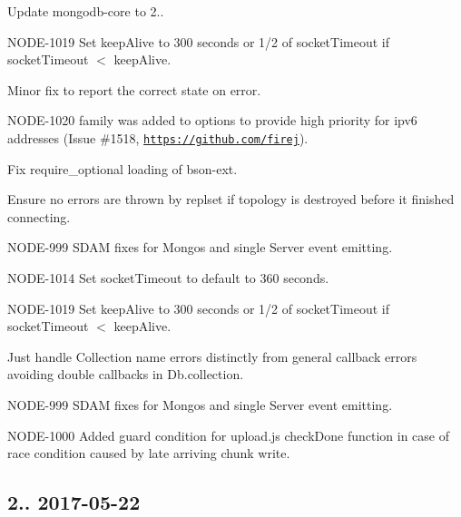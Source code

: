 \begin{DoxyItemize}
\item Update mongodb-\/core to 2..
\begin{DoxyItemize}
\item N\+O\+D\+E-\/1019 Set keep\+Alive to 300 seconds or 1/2 of socket\+Timeout if socket\+Timeout $<$ keep\+Alive.
\item Minor fix to report the correct state on error.
\item N\+O\+D\+E-\/1020 \textquotesingle{}family\textquotesingle{} was added to options to provide high priority for ipv6 addresses (Issue \#1518, \href{https://github.com/firej}{\tt https\+://github.\+com/firej}).
\item Fix require\+\_\+optional loading of bson-\/ext.
\item Ensure no errors are thrown by replset if topology is destroyed before it finished connecting.
\item N\+O\+D\+E-\/999 S\+D\+AM fixes for Mongos and single Server event emitting.
\item N\+O\+D\+E-\/1014 Set socket\+Timeout to default to 360 seconds.
\item N\+O\+D\+E-\/1019 Set keep\+Alive to 300 seconds or 1/2 of socket\+Timeout if socket\+Timeout $<$ keep\+Alive.
\end{DoxyItemize}
\item Just handle Collection name errors distinctly from general callback errors avoiding double callbacks in Db.\+collection.
\item N\+O\+D\+E-\/999 S\+D\+AM fixes for Mongos and single Server event emitting.
\item N\+O\+D\+E-\/1000 Added guard condition for upload.\+js check\+Done function in case of race condition caused by late arriving chunk write.
\end{DoxyItemize}

\subsection*{2.. 2017-\/05-\/22 }


